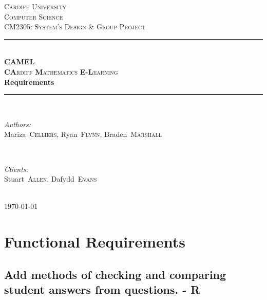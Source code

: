 \documentclass[12pt]{article}
\begin{document}
	\begin{titlepage}
		\newcommand{\HRule}{\rule{\linewidth}{0.5mm}}

		\center

		\textsc{\LARGE Cardiff University}\\[1.5cm]
		\textsc{\Large Computer Science}\\[0.5cm]
		\textsc{\large CM2305: System's Design \& Group Project}\\[0.5cm]

		\HRule \\[0.4cm]
		\textsc{\Large \textbf{CAMEL}}\\[0.1cm]
		\textsc{\Large \textbf{CA}rdiff \textbf{M}athematics \textbf{E-L}earning}\\[0.7cm]
		{\huge\bfseries Requirements}\\[0.4cm]
		\HRule \\[1.5cm]

		\begin{minipage}{0.4\textwidth}
			\begin{flushleft} \large
				\emph{Authors:}\\
				\mbox{Mariza \textsc{Celliers}}, \mbox{Ryan \textsc{Flynn}}, \mbox{Braden \textsc{Marshall}}
			\end{flushleft}
		\end{minipage}
		~
		\begin{minipage}{0.4\textwidth}
			\begin{flushright} \large
				\emph{Clients:} \\
				\mbox{Stuart \textsc{Allen}}, \mbox{Dafydd \textsc{Evans}}
			\end{flushright}
		\end{minipage}\\[3cm]

		{\large \today}\\[2cm]

		\vfill
	\end{titlepage}


	\tableofcontents

	\newpage

	\section{Functional Requirements}
	\subsection{Add methods of checking and comparing student answers from questions. - R}
\end{document}
